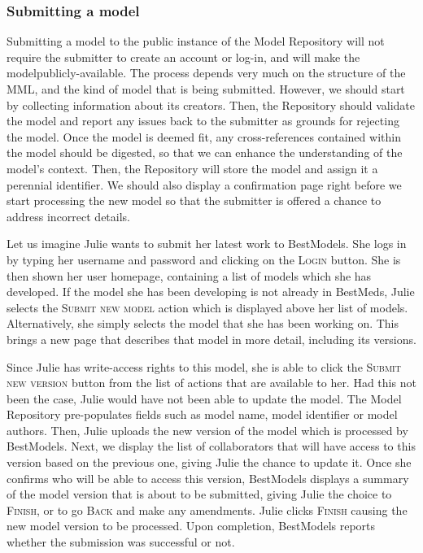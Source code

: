 \subsubsection{Submitting a model}
Submitting a model to the public instance of the \ddmore Model Repository will not require the submitter to create an account or log-in, and will make the modelpublicly-available. The process depends very much on the structure of the MML, and the kind of model that is being submitted. However, we should start by collecting information about its creators. Then, the Repository should validate the model and report any issues back to the submitter as grounds for rejecting the model. Once the model is deemed fit, any cross-references contained within the model should be digested, so that we can enhance the understanding of the model's context. Then, the Repository will store the model and assign it a perennial identifier. We should also display a confirmation page right before we start processing the new model so that the submitter is offered a chance to address incorrect details.

Let us imagine Julie wants to submit her latest work to BestModels. She logs in by typing her username and password and clicking on the \textsc{Login} button. She is then shown her user homepage, containing a list of models which she has developed. If the model she has been developing is not already in BestMeds, Julie selects the \textsc{Submit new model} action which is displayed above her list of models. Alternatively, she simply selects the model that she has been working on. This brings a new page that describes that model in more detail, including its versions.  

Since Julie has write-access rights to this model, she is able to click the \textsc{Submit new version} button from the list of actions that are available to her. Had this not been the case, Julie would have not been able to update the model. The Model Repository pre-populates fields such as model name, model identifier or model authors. Then, Julie uploads the new version of the model which is processed by BestModels. Next, we display the list of collaborators that will have access to this version based on the previous one, giving Julie the chance to update it. Once she confirms who will be able to access this version, BestModels displays a summary of the model version that is about to be submitted, giving Julie the choice to \textsc{Finish}, or to go \textsc{Back} and make any amendments. Julie clicks \textsc{Finish} causing the new model version to be processed. Upon completion, BestModels reports whether the submission was successful or not.

